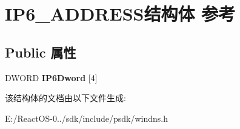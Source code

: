 \hypertarget{struct_i_p6___a_d_d_r_e_s_s}{}\section{I\+P6\+\_\+\+A\+D\+D\+R\+E\+S\+S结构体 参考}
\label{struct_i_p6___a_d_d_r_e_s_s}
\subsection*{Public 属性}
\begin{DoxyCompactItemize}
\item 
\mbox{\label{struct_i_p6___a_d_d_r_e_s_s_a62dbd3d0930bd739cc71dd663246edc1}} 
D\+W\+O\+RD {\bfseries I\+P6\+Dword} \mbox{[}4\mbox{]}
\end{DoxyCompactItemize}


该结构体的文档由以下文件生成\+:\begin{DoxyCompactItemize}
\item 
E\+:/\+React\+O\+S-\/0../sdk/include/psdk/windns.\+h\end{DoxyCompactItemize}

